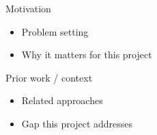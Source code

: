 
\begin{frame}{Motivation}
  \begin{itemize}
    \item Problem setting
    \item Why it matters for this project
  \end{itemize}
\end{frame}

\begin{frame}{Prior work / context}
  \begin{itemize}
    \item Related approaches
    \item Gap this project addresses
  \end{itemize}
\end{frame}
